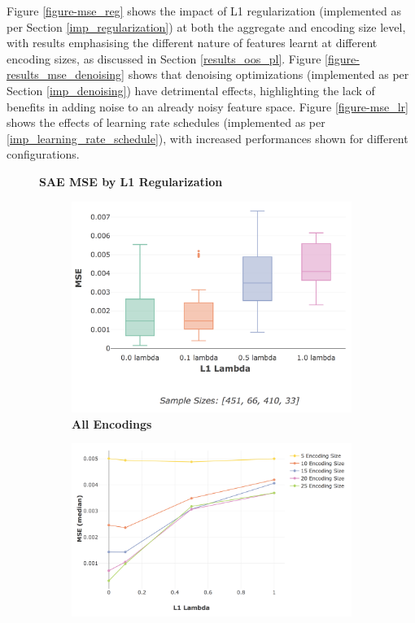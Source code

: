 \documentclass[a4paper,11pt,oneside]{article}
\theoremstyle{plain}
\theoremstyle{definition}
\begin{document}
	Figure \ref{figure-mse_reg} shows the impact of L1 regularization (implemented as per Section \ref{imp_regularization}) at both the aggregate and encoding size level, with results emphasising the different nature of features learnt at different encoding sizes, as discussed in Section \ref{results_oos_pl}. Figure \ref{figure-results_mse_denoising} shows that denoising optimizations (implemented as per Section \ref{imp_denoising}) have detrimental effects, highlighting the lack of benefits in adding noise to an already noisy feature space. Figure \ref{figure-mse_lr} shows the effects of learning rate schedules (implemented as per  \ref{imp_learning_rate_schedule}), with increased performances shown for different configurations.
	
	\begin{figure}[H]
	\centering
	\textbf{SAE MSE by L1 Regularization}
	\begin{subfigure}{.49\textwidth}
		\centering 
		\includegraphics[scale=0.3]{images/results/network/reg/actual_mse_reg.png}
		\caption{\textbf{All Encodings} 
			\newline }
		\label{figure-actual_mse_reg}
	\end{subfigure}%
	\begin{subfigure}{.49\textwidth}
		\centering 
		\includegraphics[scale=0.3]{images/results/network/reg/actual_sae_mse_by_encoding.png}

\end{subfigure}
\end{figure}
\end{document}
